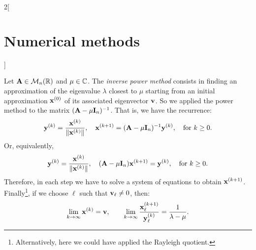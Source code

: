 \documentclass[../../../main.tex]{subfiles}
\begin{document}
\begin{multicols}{2}[\section{Numerical methods}]
\begin{method}
    Let $\vb{A}\in\mathcal{M}_n(\mathbb{R})$ and $\mu\in\mathbb{C}$. The \textit{inverse power method} consists in finding an approximation of the eigenvalue $\lambda$ closest to $\mu$ starting from an initial approximation $\vb{x}^{(0)}$ of its associated eigenvector $\vb{v}$. So we applied the power method to the matrix $(\vb{A}-\mu\vb{I}_n)^{-1}$. That is, we have the recurrence: $$\vb{y}^{(k)}=\frac{\vb{x}^{(k)}}{\|\vb{x}^{(k)}\|},\quad\vb{x}^{(k+1)}=(\vb{A}-\mu\vb{I}_n)^{-1}\vb{y}^{(k)},\quad\text{for }k\geq 0.$$ Or, equivalently, $$\vb{y}^{(k)}=\frac{\vb{x}^{(k)}}{\|\vb{x}^{(k)}\|},\quad(\vb{A}-\mu\vb{I}_n)\vb{x}^{(k+1)}=\vb{y}^{(k)},\quad\text{for }k\geq 0.$$ Therefore, in each step we have to solve a system of equations to obtain $\vb{x}^{(k+1)}$. Finally\footnote{Alternatively, here we could have applied the Rayleigh quotient.}, if we choose $\ell$ such that $\vb{v}_\ell\ne0$, then: $$\lim_{k\to\infty}\vb{x}^{(k)}=\vb{v},\qquad\lim_{k\to\infty}\frac{\vb{x}_\ell^{(k+1)}}{\vb{y}_\ell^{(k)}}=\frac{1}{\lambda-\mu}.$$
\end{method}

\end{multicols}
\end{document}
